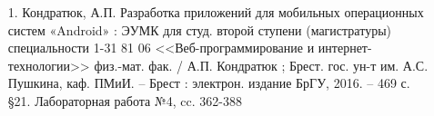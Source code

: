 \documentclass[12pt, a4paper, simple]{eskdtext}
\begin{document}
    \begin{enumerate}
        \item[1.] Кондратюк, А.П. Разработка приложений для мобильных операционных систем «Android» :
        ЭУМК для студ. второй ступени (магистратуры) специальности 1-31 81 06 <<Веб-программирование и интернет-технологии>>
        физ.-мат. фак. / А.П. Кондратюк ; Брест. гос. ун-т им. А.С. Пушкина, каф. ПМиИ. – Брест :
        электрон. издание БрГУ, 2016. – 469 с.\\
        §21. Лабораторная работа №4, cc. 362-388
    \end{enumerate}
    \newpage
\end{document}
